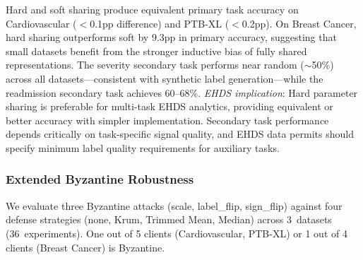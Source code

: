\documentclass[conference]{IEEEtran}
\begin{document}
\begin{table}[htbp]
\centering
\caption{Multi-Task FL: Primary and Secondary Task Accuracy (\%)}
\label{tab:multitask_fl}

\vspace{1mm}
\footnotesize{Hard and soft sharing produce equivalent primary task accuracy on Cardiovascular ($<$0.1pp difference) and PTB-XL ($<$0.2pp). On Breast Cancer, hard sharing outperforms soft by 9.3pp in primary accuracy, suggesting that small datasets benefit from the stronger inductive bias of fully shared representations. The severity secondary task performs near random ($\sim$50\%) across all datasets---consistent with synthetic label generation---while the readmission secondary task achieves 60--68\%. \textit{EHDS implication}: Hard parameter sharing is preferable for multi-task EHDS analytics, providing equivalent or better accuracy with simpler implementation. Secondary task performance depends critically on task-specific signal quality, and EHDS data permits should specify minimum label quality requirements for auxiliary tasks.}
\end{table}

\subsubsection{Extended Byzantine Robustness}
\label{sec:byzantine_extended}

We evaluate three Byzantine attacks (scale, label\_flip, sign\_flip) against four defense strategies (none, Krum, Trimmed Mean, Median) across 3~datasets (36~experiments). One out of 5 clients (Cardiovascular, PTB-XL) or 1 out of 4 clients (Breast Cancer) is Byzantine.
\end{document}

